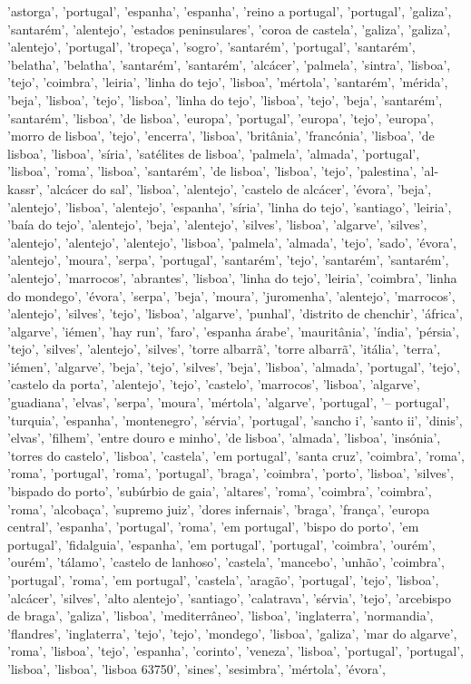 \documentclass{article}
\begin{document}
\begin{itemize}
'astorga', 'portugal', 'espanha', 'espanha', 'reino a portugal', 'portugal', 'galiza', 'santarém', 'alentejo', 'estados peninsulares', 'coroa de castela', 'galiza', 'galiza', 'alentejo', 'portugal', 'tropeça', 'sogro', 'santarém', 'portugal', 'santarém', 'belatha', 'belatha', 'santarém', 'santarém', 'alcácer', 'palmela', 'sintra', 'lisboa', 'tejo', 'coimbra', 'leiria', 'linha do tejo', 'lisboa', 'mértola', 'santarém', 'mérida', 'beja', 'lisboa', 'tejo', 'lisboa', 'linha do tejo', 'lisboa', 'tejo', 'beja', 'santarém', 'santarém', 'lisboa', 'de lisboa', 'europa', 'portugal', 'europa', 'tejo', 'europa', 'morro de lisboa', 'tejo', 'encerra', 'lisboa', 'britânia', 'francónia', 'lisboa', 'de lisboa', 'lisboa', 'síria', 'satélites de lisboa', 'palmela', 'almada', 'portugal', 'lisboa', 'roma', 'lisboa', 'santarém', 'de lisboa', 'lisboa', 'tejo', 'palestina', 'al-kassr', 'alcácer do sal', 'lisboa', 'alentejo', 'castelo de alcácer', 'évora', 'beja', 'alentejo', 'lisboa', 'alentejo', 'espanha', 'síria', 'linha do tejo', 'santiago', 'leiria', 'baía do tejo', 'alentejo', 'beja', 'alentejo', 'silves', 'lisboa', 'algarve', 'silves', 'alentejo', 'alentejo', 'alentejo', 'lisboa', 'palmela', 'almada', 'tejo', 'sado', 'évora', 'alentejo', 'moura', 'serpa', 'portugal', 'santarém', 'tejo', 'santarém', 'santarém', 'alentejo', 'marrocos', 'abrantes', 'lisboa', 'linha do tejo', 'leiria', 'coimbra', 'linha do mondego', 'évora', 'serpa', 'beja', 'moura', 'juromenha', 'alentejo', 'marrocos', 'alentejo', 'silves', 'tejo', 'lisboa', 'algarve', 'punhal', 'distrito de chenchir', 'áfrica', 'algarve', 'iémen', 'hay run', 'faro', 'espanha árabe', 'mauritânia', 'índia', 'pérsia', 'tejo', 'silves', 'alentejo', 'silves', 'torre albarrã', 'torre albarrã', 'itália', 'terra', 'iémen', 'algarve', 'beja', 'tejo', 'silves', 'beja', 'lisboa', 'almada', 'portugal', 'tejo', 'castelo da porta', 'alentejo', 'tejo', 'castelo', 'marrocos', 'lisboa', 'algarve', 'guadiana', 'elvas', 'serpa', 'moura', 'mértola', 'algarve', 'portugal', '– portugal', 'turquia', 'espanha', 'montenegro', 'sérvia', 'portugal', 'sancho i', 'santo ii', 'dinis', 'elvas', 'filhem', 'entre douro e minho', 'de lisboa', 'almada', 'lisboa', 'insónia', 'torres do castelo', 'lisboa', 'castela', 'em portugal', 'santa cruz', 'coimbra', 'roma', 'roma', 'portugal', 'roma', 'portugal', 'braga', 'coimbra', 'porto', 'lisboa', 'silves', 'bispado do porto', 'subúrbio de gaia', 'altares', 'roma', 'coimbra', 'coimbra', 'roma', 'alcobaça', 'supremo juiz', 'dores infernais', 'braga', 'frança', 'europa central', 'espanha', 'portugal', 'roma', 'em portugal', 'bispo do porto', 'em portugal', 'fidalguia', 'espanha', 'em portugal', 'portugal', 'coimbra', 'ourém', 'ourém', 'tálamo', 'castelo de lanhoso', 'castela', 'mancebo', 'unhão', 'coimbra', 'portugal', 'roma', 'em portugal', 'castela', 'aragão', 'portugal', 'tejo', 'lisboa', 'alcácer', 'silves', 'alto alentejo', 'santiago', 'calatrava', 'sérvia', 'tejo', 'arcebispo de braga', 'galiza', 'lisboa', 'mediterrâneo', 'lisboa', 'inglaterra', 'normandia', 'flandres', 'inglaterra', 'tejo', 'tejo', 'mondego', 'lisboa', 'galiza', 'mar do algarve', 'roma', 'lisboa', 'tejo', 'espanha', 'corinto', 'veneza', 'lisboa', 'portugal', 'portugal', 'lisboa', 'lisboa', 'lisboa 63750', 'sines', 'sesimbra', 'mértola', 'évora', 
\end{itemize}
\end{document}
